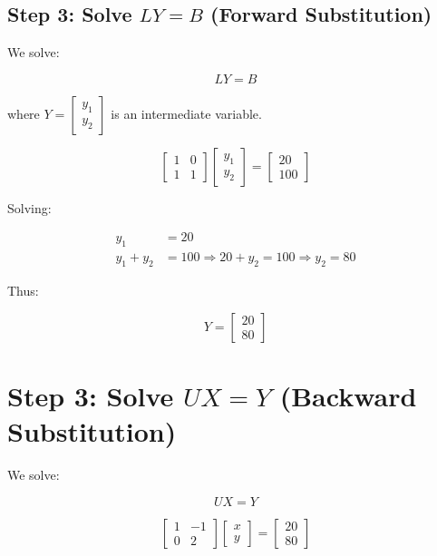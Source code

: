 \documentclass[journal]{IEEEtran}
\begin{document}
\subsection{Step 3: Solve \( LY = B \) (Forward Substitution)}
We solve:

\begin{equation}
    L Y = B
\end{equation}

where \( Y = \begin{bmatrix} y_1 \\ y_2 \end{bmatrix} \) is an intermediate variable.

\begin{equation}
    \begin{bmatrix} 1 & 0 \\ 1 & 1 \end{bmatrix}
    \begin{bmatrix} y_1 \\ y_2 \end{bmatrix} =
    \begin{bmatrix} 20 \\ 100 \end{bmatrix}
\end{equation}

Solving:

\begin{align}
    y_1 &= 20 \\
    y_1 + y_2 &= 100 \Rightarrow 20 + y_2 = 100 \Rightarrow y_2 = 80
\end{align}

Thus:

\begin{equation}
    Y = \begin{bmatrix} 20 \\ 80 \end{bmatrix}
\end{equation}

\section*{Step 3: Solve \( UX = Y \) (Backward Substitution)}
We solve:

\begin{equation}
    U X = Y
\end{equation}

\begin{equation}
    \begin{bmatrix} 1 & -1 \\ 0 & 2 \end{bmatrix}
    \begin{bmatrix} x \\ y \end{bmatrix} =
    \begin{bmatrix} 20 \\ 80 \end{bmatrix}
\end{equation}
\end{document}
